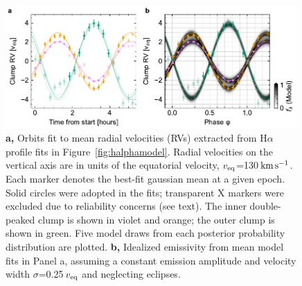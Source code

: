 \documentclass[11pt,twocolumn,tighten]{aastex7}
\newcommand{\kms}{\ensuremath{\rm km\,s^{-1}}}
\begin{document}
\begin{figure}[!t]
  \centering
  \includegraphics[width=0.99\textwidth]{f7.pdf}
  \caption{{\bf a,} Orbits fit to mean radial velocities (RVs)
  extracted from H$\alpha$ profile fits in
  Figure~\ref{fig:halphamodel}.  Radial velocities on the vertical
  axis are in units of the equatorial velocity, $v_{\rm
  eq}$=130\,\kms.  Each marker denotes the best-fit gaussian mean at a
  given epoch.  Solid circles were adopted in the fits; transparent X
  markers were excluded due to reliability concerns (see text).  The
  inner double-peaked clump is shown in violet and orange; the outer
  clump is shown in green.  Five model draws from each posterior
  probability distribution are plotted.  {\bf b,} Idealized emissivity
  from mean model fits in Panel a, assuming a constant emission
  amplitude and velocity width $\sigma$=0.25\,$v_{\rm eq}$ and
  neglecting eclipses.}
  \label{fig:orbits}
\end{figure}
\end{document}
